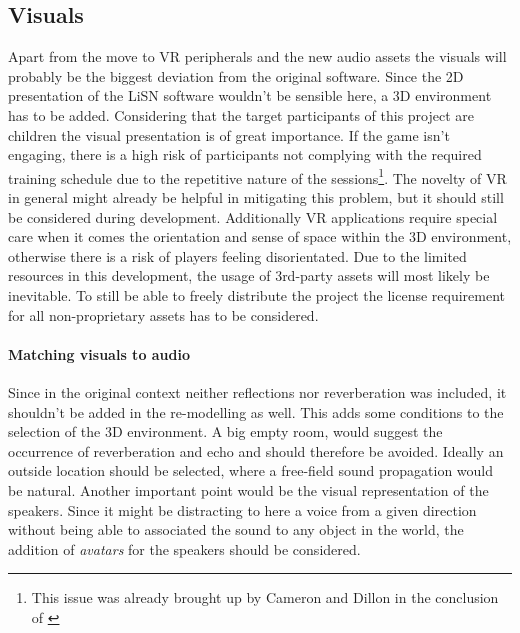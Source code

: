 \documentclass[a4paper,11pt]{article}%
\renewcommand{\\}{\vspace*{0.5\baselineskip} \newline}
\begin{document}
\subsection{Visuals}
\label{sec:visuals}
Apart from the move to \ac{VR} peripherals and the new audio assets the visuals will probably be the biggest deviation from the original software. Since the 2D presentation of the \ac{LiSN} software wouldn't be sensible here, a 3D environment has to be added.
\newline
\newline
Considering that the target participants of this project are children the visual presentation is of great importance. If the game isn't engaging, there is a high risk of participants not complying with the required training schedule due to the repetitive nature of the sessions\footnote{This issue was already brought up by Cameron and Dillon in the conclusion of \cite{LiSN-B}}.
\newline
\newline
The novelty of \ac{VR} in general might already be helpful in mitigating this problem, but it should still be considered during development. Additionally \ac{VR} applications require special care when it comes the orientation and sense of space within the 3D environment, otherwise there is a risk of players feeling disorientated.
\newline
\newline
Due to the limited resources in this development, the usage of 3rd-party assets will most likely be inevitable. To still be able to freely distribute the project the license requirement for all non-proprietary assets has to be considered.


\paragraph{Matching visuals to audio} Since in the original context neither reflections nor reverberation was included, it shouldn't be added in the re-modelling as well. This adds some conditions to the selection of the 3D environment. A big empty room, would suggest the occurrence of reverberation and echo and should therefore be avoided. Ideally an outside location should be selected, where a free-field sound propagation would be natural. Another important point would be the visual representation of the speakers. Since it might be distracting to here a voice from a given direction without being able to associated the sound to any object in the world, the addition of \textit{avatars} for the speakers should be considered.
\end{document}
